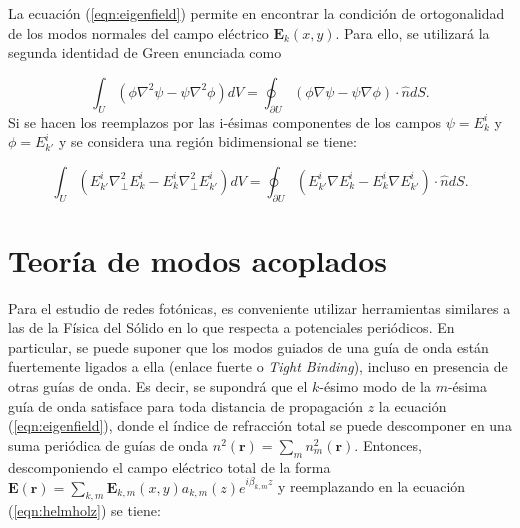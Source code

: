 La ecuación (\ref{eqn:eigenfield}) permite en encontrar la condición de ortogonalidad de los modos normales del campo eléctrico  $\textbf{E}_k(x,y)$. Para ello, se utilizará la segunda identidad de Green \cite{JacksonOrtogonality} enunciada como

\begin{equation*}
	\int_U \left(\phi \nabla^2 \psi - \psi \nabla^2 \phi\right) dV = \oint_{\partial U} \left(\phi \nabla \psi - \psi \nabla \phi\right) \cdot \hat{n} dS.
\end{equation*}
Si se hacen los reemplazos por las i-ésimas componentes de los campos $\psi = E_k^i$ y $\phi = E_{k'}^i$ y se considera una región bidimensional se tiene:

\begin{equation*}
	\int_U \left(E_{k'}^i \nabla_\perp^2 E_k^i - E_k^i \nabla_\perp^2 E_{k'}^i\right) dV = \oint_{\partial U} \left(E_{k'}^i \nabla E_k^i - E_k^i \nabla E_{k'}^i\right) \cdot \hat{n} dS.
\end{equation*}
\section{Teoría de modos acoplados}
	Para el estudio de redes fotónicas, es conveniente utilizar herramientas similares a las de la Física del Sólido en lo que respecta a potenciales periódicos. En particular, se puede suponer que los modos guiados de una guía de onda están fuertemente ligados a ella (enlace fuerte o \textit{Tight Binding}), incluso en presencia de otras guías de onda. Es decir, se supondrá que el $k$-ésimo modo de la $m$-ésima guía de onda satisface para toda distancia de propagación $z$ la ecuación (\ref{eqn:eigenfield}), donde el índice de refracción total se puede descomponer en una suma periódica de guías de onda $n^2(\textbf{r}) = \sum_{m} n^2_m(\textbf{r})$. Entonces, descomponiendo el campo eléctrico total de la forma $\textbf{E}(\textbf{r}) = \sum_{k, m} \textbf{E}_{k, m}(x, y) a_{k, m}(z) e^{i\beta_{k, m} z}$ y reemplazando en la ecuación (\ref{eqn:helmholz}) se tiene:

